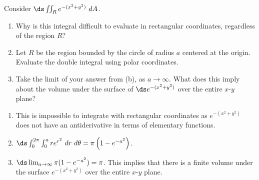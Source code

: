 {Consider $\ds \iint_R e^{-(x^2+y^2)}\ dA$.
	\begin{enumerate}
		\item Why is this integral difficult to evaluate in rectangular coordinates, regardless of the region $R$?
		\item		Let $R$ be the region bounded by the circle of radius $a$ centered at the origin. Evaluate the double integral using polar coordinates.
		\item		Take the limit of your answer from (b), as $a\to\infty$. What does this imply about the volume under the surface of $\ds e^{-(x^2+y^2)}$ over the entire $x$-$y$ plane?
	\end{enumerate}
}
{\begin{enumerate}
	\item This is impossible to integrate with rectangular coordinates as $e^{-(x^2+y^2)}$ does not have an antiderivative in terms of elementary functions.
	\item	$\ds \int_0^{2\pi}\int_0^a re^{r^2}\ dr\ d\theta = \pi \left(1-e^{-a^2}\right)$.
	\item		$\ds \lim_{a\to\infty} \pi(1-e^{-a^2})=\pi$. This implies that there is a finite volume under the surface $e^{-(x^2+y^2)}$ over the entire $x$-$y$ plane.
\end{enumerate}
}